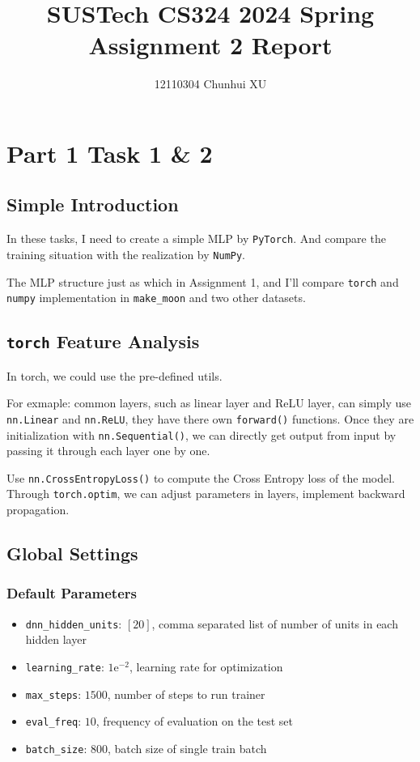 \documentclass{article}
\title{SUSTech CS324 2024 Spring Assignment 2 Report}
\author{12110304 Chunhui XU}
\begin{document}
\maketitle

\section{Part 1 Task 1 \& 2}

\subsection{Simple Introduction}

In these tasks, I need to create a simple MLP by \texttt{PyTorch}. And compare the training situation with the realization by \texttt{NumPy}.

The MLP structure just as which in Assignment 1, and I'll compare \texttt{torch} and \texttt{numpy} implementation in \texttt{make\_moon} and two other datasets.

\subsection{\texttt{torch} Feature Analysis}

In torch, we could use the pre-defined utils.

For exmaple: common layers, such as linear layer and ReLU layer, can simply use \texttt{nn.Linear} and \texttt{nn.ReLU}, they have there own \texttt{forward()} functions. Once they are initialization with \texttt{nn.Sequential()}, we can directly get output from input by passing it through each layer one by one.

Use \texttt{nn.CrossEntropyLoss()} to compute the Cross Entropy loss of the model. Through \texttt{torch.optim}, we can adjust parameters in layers, implement backward propagation.

\subsection{Global Settings}

\subsubsection{Default Parameters}

\begin{itemize}
    \item \texttt{dnn\_hidden\_units}: $[20]$, comma separated list of number of units in each hidden layer
    \item \texttt{learning\_rate}: $1\mathrm{e}^{-2}$, learning rate for optimization
    \item \texttt{max\_steps}: $1500$, number of steps to run trainer
    \item \texttt{eval\_freq}: $10$, frequency of evaluation on the test set
    \item \texttt{batch\_size}: $800$, batch size of single train batch
\end{itemize}
\end{document}
